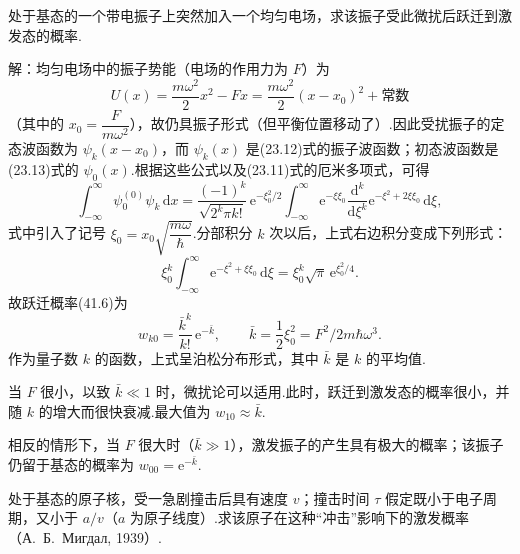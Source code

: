 \begin{xiti}

\quad 处于基态的一个带电振子上突然加入一个均匀电场，求该振子受此微扰后跃迁到激发态的概率.

解：均匀电场中的振子势能（电场的作用力为 $F$）为
\begin{equation*}
  U(x)=\frac{m\omega^2}{2}x^2-Fx
  =\frac{m\omega^2}{2}\left(x-x_0\right)^2+\text{常数}
\end{equation*}
（其中的 $x_0=\dfrac{F}{m\omega^2}$），故仍具振子形式（但平衡位置移动了）.因此受扰振子的定态波函数为 $\psi_k\left(x-x_0\right)$，而 $\psi_k(x)$ 是(23.12)式的振子波函数；初态波函数是(23.13)式的 $\psi_0(x)$.根据这些公式以及(23.11)式的厄米多项式，可得
\begin{equation*}
  \int_{-\infty}^{\infty}\psi_0^{(0)}\psi_k\,\mathrm{d}x
  =\frac{(-1)^k}{\sqrt{2^k\pi k!}}\,\mathrm{e}^{-\xi_0^2/2}
  \int_{-\infty}^{\infty}\mathrm{e}^{-\xi\xi_0}
  \frac{\mathrm{d}^k}{\mathrm{d}\xi^k}\mathrm{e}^{-\xi^2+2\xi\xi_0}\,\mathrm{d}\xi,
\end{equation*}
式中引入了记号 $\xi_0=x_0\sqrt{\dfrac{m\omega}{\hbar}}$.分部积分 $k$ 次以后，上式右边积分变成下列形式：
\begin{equation*}
  \xi_0^k\int_{-\infty}^{\infty}\mathrm{e}^{-\xi^2+\xi\xi_0}\,\mathrm{d}\xi
  =\xi_0^k\sqrt{\pi}\,\mathrm{e}^{\xi_0^2/4}.
\end{equation*}
故跃迁概率(41.6)为
\begin{equation*}
  w_{k0}=\frac{\bar{k}^k}{k!}\,\mathrm{e}^{-\bar{k}},\qquad
  \bar{k}=\frac{1}{2}\xi_0^2=F^2/2m\hbar\omega^3.
\end{equation*}
作为量子数 $k$ 的函数，上式呈泊松分布形式，其中 $\bar{k}$ 是 $k$ 的平均值.

当 $F$ 很小，以致 $\bar{k}\ll1$ 时，微扰论可以适用.此时，跃迁到激发态的概率很小，并随 $k$ 的增大而很快衰减.最大值为 $w_{10}\approx\bar{k}$.

相反的情形下，当 $F$ 很大时（$\bar{k}\gg1$），激发振子的产生具有极大的概率；该振子仍留于基态的概率为 $w_{00}=\mathrm{e}^{-\bar{k}}$.

\quad 处于基态的原子核，受一急剧撞击后具有速度 $v$；撞击时间 $\tau$ 假定既小于电子周期，又小于 $a/v$（$a$ 为原子线度）.求该原子在这种“冲击”影响下的激发概率（А.~Б.~Мигдал, 1939）.


\end{xiti}
